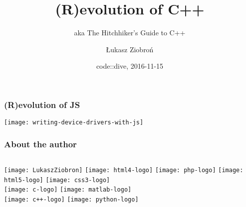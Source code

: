 \author{Łukasz Ziobroń}
\title[Crisis]{(R)evolution of C++}
\date{code::dive, 2016-11-15}
\subject{Computer Science}
\subtitle{aka The Hitchhiker's Guide to C++}

\begin{frame}
\titlepage
\end{frame}

\begin{frame}
  \frametitle{(R)evolution of JS}
  \centering 
  \texttt{[image: writing-device-drivers-with-js]}
\end{frame}

\begin{frame}
  \frametitle{About the author}
  \begin{columns}
      \texttt{[image: LukaszZiobron]}
      \centering
      \texttt{[image: html4-logo]} \pause
      \texttt{[image: php-logo]} \pause
      \texttt{[image: html5-logo]}
      \texttt{[image: css3-logo]} \\ \pause
      \texttt{[image: c-logo]} \pause
      \texttt{[image: matlab-logo]} \\ \pause
      \texttt{[image: c++-logo]} \pause %
      \texttt{[image: python-logo]}
  \end{columns}
\end{frame}


